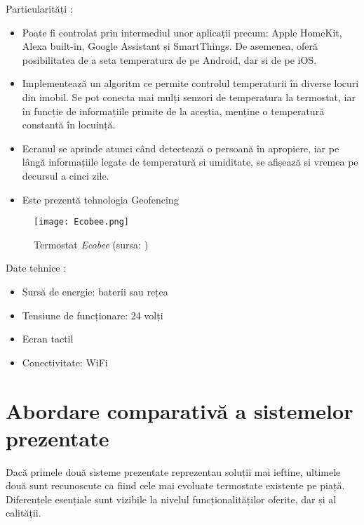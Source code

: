 \vspace{2em}

	Particularități \cite{ecobee}:
	\begin{itemize}
	\setlength{\itemindent}{2em}
		\itemsep0em
		\item Poate fi controlat prin intermediul unor aplicații precum: Apple HomeKit, Alexa built-in, Google Assistant și SmartThings. De asemenea, oferă posibilitatea de a seta temperatura de pe Android, dar si de pe iOS.
		\item Implementează un algoritm ce permite controlul temperaturii în diverse locuri din imobil. Se pot conecta mai mulți senzori de temperatura la termostat, iar în funcție de informațiile primite de la aceștia, menține o temperatură constantă în locuință.
		\item Ecranul se aprinde atunci când detectează o persoană în apropiere, iar pe lângă informațiile legate de temperatură si umiditate, se afișează si vremea pe decursul a cinci zile.
		\item Este prezentă tehnologia Geofencing
	\end{itemize}

\vspace{2em}

\begin{wrapfigure}[5]{r}{0.5\textwidth}
	\centering
	\texttt{[image: Ecobee.png]}
	\caption{Termostat \textit{Ecobee} (sursa: \cite{ecobee})}
\end{wrapfigure}

	Date tehnice \cite{ecobee}:
	\begin{itemize}
	\setlength{\itemindent}{2em}
		\itemsep0em
		\item Sursă de energie: baterii sau rețea
		\item Tensiune de funcționare: 24 volți
		\item Ecran tactil
		\item Conectivitate: WiFi
	\end{itemize}
\vspace{0.5em}

\section{Abordare comparativă a sistemelor prezentate}
	Dacă primele două sisteme prezentate reprezentau soluții mai ieftine, ultimele două sunt recunoscute ca fiind cele mai evoluate termostate existente pe piață. Diferențele esențiale sunt vizibile la nivelul funcționalităților oferite, dar și al calității.

